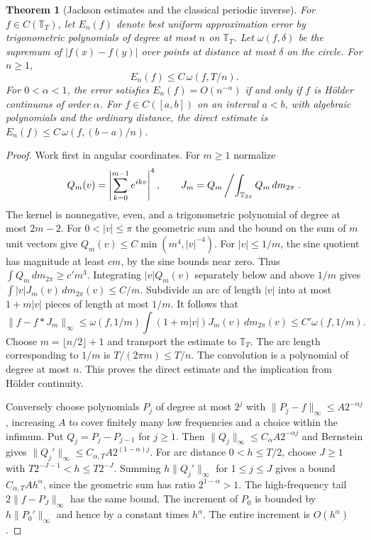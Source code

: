 \documentclass[11pt,oneside,openany]{book}
\newtheorem{theorem}{Theorem}[chapter]
\theoremstyle{definition}
\theoremstyle{remark}
\begin{document}
\begin{theorem}[Jackson estimates and the classical periodic inverse]
\label{p102:U1-08}
For $f\in C(\mathbb T_T)$, let $E_n(f)$ denote best uniform approximation error by
trigonometric polynomials of degree at most $n$ on $\mathbb T_T$.
Let $\omega(f,\delta)$ be the supremum of $|f(x)-f(y)|$ over
points at distance at most $\delta$ on the circle. For $n\ge1$,
\[
 E_n(f)\le C\,\omega(f,T/n).
\]
For $0<\alpha<1$, the error satisfies $E_n(f)=O(n^{-\alpha})$
if and only if $f$ is H\"older continuous of order $\alpha$.
For $f\in C([a,b])$ on an interval $a<b$, with algebraic polynomials and the ordinary distance,
the direct estimate is $E_n(f)\le C\,\omega(f,(b-a)/n)$.
\end{theorem}

\begin{proof}
Work first in angular coordinates. For $m\ge1$ normalize
\[
 Q_m(v)=\left|\sum_{k=0}^{m-1}e^{ikv}\right|^4,\qquad
 J_m=Q_m\left/\int_{\mathbb T_{2\pi}} Q_m\,dm_{2\pi}\right. .
\]
The kernel is nonnegative, even, and a trigonometric polynomial
of degree at most $2m-2$. For $0<|v|\le\pi$ the geometric sum
and the bound on the sum of $m$ unit vectors give
$Q_m(v)\le C\min(m^4,|v|^{-4})$. For $|v|\le 1/m$,
the sine quotient has magnitude at least $c m$, by the sine
bounds near zero. Thus $\int Q_m\,dm_{2\pi}\ge c' m^3$.
Integrating $|v|Q_m(v)$ separately below and above $1/m$
gives $\int |v|J_m(v)\,dm_{2\pi}(v)\le C/m$.
Subdivide an arc of length $|v|$ into at most $1+m|v|$
pieces of length at most $1/m$. It follows that
\[
 \|f-f*J_m\|_\infty\le
  \omega(f,1/m)\int(1+m|v|)J_m(v)\,dm_{2\pi}(v)
  \le C'\omega(f,1/m).
\]
Choose $m=\lfloor n/2\rfloor+1$ and transport the estimate to
$\mathbb T_T$. The arc length corresponding to $1/m$ is
$T/(2\pi m)\le T/n$. The convolution is a polynomial of
degree at most $n$. This proves the direct estimate and the
implication from H\"older continuity.

Conversely choose polynomials $P_j$ of degree at most $2^j$
with $\|P_j-f\|_\infty\le A2^{-\alpha j}$, increasing $A$
to cover finitely many low frequencies and a choice within
the infimum. Put $Q_j=P_j-P_{j-1}$ for $j\ge1$. Then
$\|Q_j\|_\infty\le C_\alpha A2^{-\alpha j}$ and Bernstein gives
$\|Q_j'\|_\infty\le C_{\alpha,T} A2^{(1-\alpha)j}$.
For arc distance $0<h\le T/2$, choose $J\ge1$ with
$T2^{-J-1}<h\le T2^{-J}$. Summing
$h\|Q_j'\|_\infty$ for $1\le j\le J$ gives a bound
$C_{\alpha,T}Ah^\alpha$, since the geometric sum has ratio
$2^{1-\alpha}>1$. The high-frequency tail
$2\|f-P_J\|_\infty$ has the same bound. The increment of $P_0$
is bounded by $h\|P_0'\|_\infty$ and hence by a constant times
$h^\alpha$. The entire increment is $O(h^\alpha)$.


\end{proof}
\end{document}

